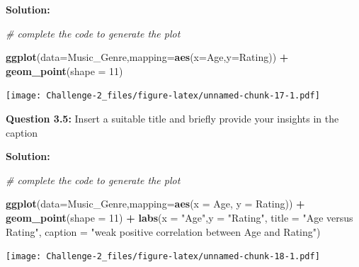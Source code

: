\documentclass[
]{article}
\newenvironment{Shaded}{\begin{snugshade}}{\end{snugshade}}
\newcommand{\AttributeTok}[1]{\textcolor[rgb]{0.13,0.29,0.53}{#1}}
\newcommand{\CommentTok}[1]{\textcolor[rgb]{0.56,0.35,0.01}{\textit{#1}}}
\newcommand{\DecValTok}[1]{\textcolor[rgb]{0.00,0.00,0.81}{#1}}
\newcommand{\FunctionTok}[1]{\textcolor[rgb]{0.13,0.29,0.53}{\textbf{#1}}}
\newcommand{\NormalTok}[1]{#1}
\newcommand{\SpecialCharTok}[1]{\textcolor[rgb]{0.81,0.36,0.00}{\textbf{#1}}}
\newcommand{\StringTok}[1]{\textcolor[rgb]{0.31,0.60,0.02}{#1}}
\begin{document}
\textbf{Solution:}

\begin{Shaded}
\begin{Highlighting}[]
\CommentTok{\# complete the code to generate the plot}

\FunctionTok{ggplot}\NormalTok{(}\AttributeTok{data=}\NormalTok{Music\_Genre,}\AttributeTok{mapping=}\FunctionTok{aes}\NormalTok{(}\AttributeTok{x=}\NormalTok{Age,}\AttributeTok{y=}\NormalTok{Rating)) }\SpecialCharTok{+} \FunctionTok{geom\_point}\NormalTok{(}\AttributeTok{shape =} \DecValTok{11}\NormalTok{) }
\end{Highlighting}
\end{Shaded}

\texttt{[image: Challenge-2\_files/figure-latex/unnamed-chunk-17-1.pdf]}

\textbf{Question 3.5:} Insert a suitable title and briefly provide your
insights in the caption

\textbf{Solution:}

\begin{Shaded}
\begin{Highlighting}[]
\CommentTok{\# complete the code to generate the plot}


\FunctionTok{ggplot}\NormalTok{(}\AttributeTok{data=}\NormalTok{Music\_Genre,}\AttributeTok{mapping=}\FunctionTok{aes}\NormalTok{(}\AttributeTok{x =}\NormalTok{ Age, }\AttributeTok{y =}\NormalTok{ Rating)) }\SpecialCharTok{+}
   \FunctionTok{geom\_point}\NormalTok{(}\AttributeTok{shape =} \DecValTok{11}\NormalTok{) }\SpecialCharTok{+}
   \FunctionTok{labs}\NormalTok{(}\AttributeTok{x =} \StringTok{"Age"}\NormalTok{,}\AttributeTok{y =} \StringTok{"Rating"}\NormalTok{,}
 \AttributeTok{title =} \StringTok{"Age versus Rating"}\NormalTok{,}
 \AttributeTok{caption =} \StringTok{"weak positive correlation between Age and Rating"}\NormalTok{)}
\end{Highlighting}
\end{Shaded}

\texttt{[image: Challenge-2\_files/figure-latex/unnamed-chunk-18-1.pdf]}
\end{document}
